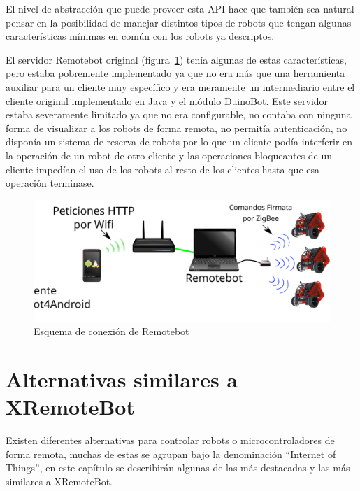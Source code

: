 El nivel de abstracción que puede proveer esta API hace que también sea
natural pensar en la posibilidad de manejar distintos tipos de robots
que tengan algunas características mínimas en común con los robots ya
descriptos.

El servidor Remotebot original (figura~\ref{fig:arquitectura_remotebot})
tenía algunas de estas características, pero
estaba pobremente implementado ya que no era más que una herramienta auxiliar
para un cliente muy específico y era meramente un intermediario entre el
cliente original implementado en Java y el módulo DuinoBot. Este servidor
estaba severamente limitado
ya que no era configurable, no contaba con ninguna forma de visualizar a los
robots de forma remota, no permitía autenticación, no disponía un sistema
de reserva de robots por lo que un cliente podía interferir en la operación
de un robot de otro cliente y las operaciones bloqueantes de un cliente
impedían el uso de los robots al resto de los clientes hasta que esa operación
terminase.


\begin{figure}
    \centering
    \includegraphics[width=\textwidth]{figures/arquitectura_remotebot}
    \caption{Esquema de conexión de Remotebot}
    \label{fig:arquitectura_remotebot}
\end{figure}


\section{Alternativas similares a XRemoteBot}

Existen diferentes alternativas para controlar robots o microcontroladores
de forma remota, muchas de estas se agrupan bajo la denominación
``Internet of Things'', en este capítulo se describirán algunas de las
más destacadas y las más similares a XRemoteBot.

